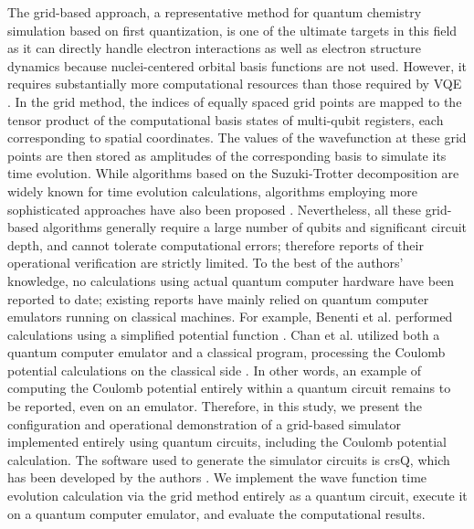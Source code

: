 \documentclass[manuscript_main.tex]{subfiles}
\begin{document}
The grid-based approach, a representative method for quantum chemistry
simulation based on first quantization, is one of the ultimate targets in this
field as it can directly handle electron interactions as well as electron
structure dynamics because nuclei-centered orbital basis functions are not used.
However, it requires substantially more computational resources than those
required by VQE \cite{kassal2008.pnas.0808245105}. In the grid method, the
indices of equally spaced grid points are mapped to the tensor product of the
computational basis states of multi-qubit registers, each corresponding to
spatial coordinates. The values of the wavefunction at these grid points are
then stored as amplitudes of the corresponding basis to simulate its time
evolution. While algorithms based on the Suzuki-Trotter decomposition are widely
known for time evolution calculations, algorithms employing more sophisticated
approaches have also been proposed \cite{Berry2015.PhysRevLett.114.090502,
Babbush_2018, YuanSu.PRXQuantum.2.040332, eklund2026.arXiv2603.19007}.
Nevertheless, all these grid-based algorithms generally require a
large number of qubits and significant circuit depth, and cannot tolerate
computational errors; therefore reports of their operational verification are strictly
limited. To the best of the authors' knowledge, no calculations using actual
quantum computer hardware have been reported to date; existing reports have
mainly relied on quantum computer emulators running on classical machines. For example,
Benenti et al. performed calculations using a simplified potential function
\cite{Benenti2008.10.1119/1.2894532}. Chan et al. utilized both a quantum
computer emulator and a classical program, processing the Coulomb potential
calculations on the classical side \cite{Chan2023.sciadv.abo7484}. In other
words, an example of computing the Coulomb potential entirely within a quantum
circuit remains to be reported, even on an emulator. Therefore, in this
study, we present the configuration and operational demonstration of a
grid-based simulator implemented entirely using quantum circuits, including the
Coulomb potential calculation. The software used to generate the simulator
circuits is crsQ, which has been developed by the authors
\cite{takahashi2024.doi:10.1021/acs.jctc.4c00708}. We implement the wave
function time evolution calculation via the grid method entirely as a quantum
circuit, execute it on a quantum computer emulator, and evaluate the
computational results.
\end{document}
